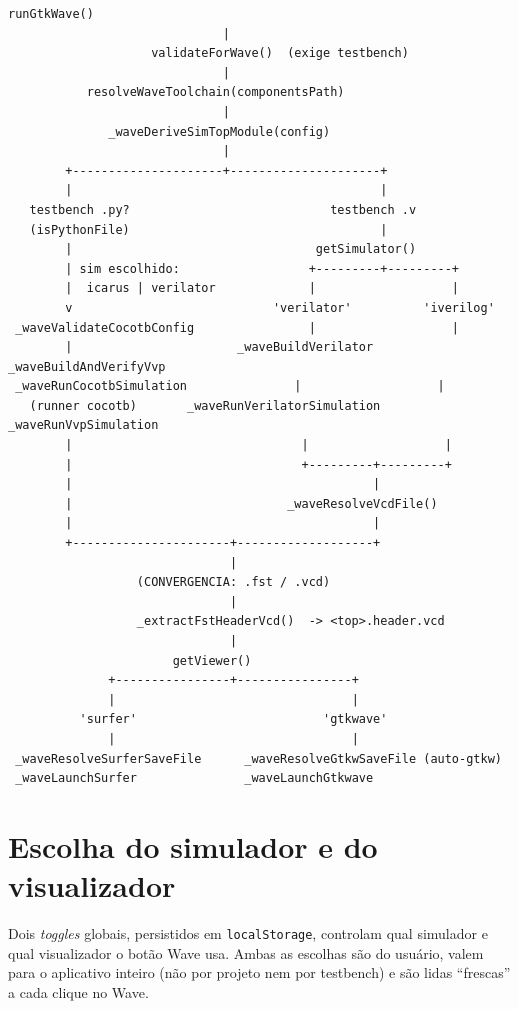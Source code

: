 \begin{lstlisting}[caption={Os quatro caminhos convergindo no arquivo de ondas e no visualizador.},captionpos=b]
                         runGtkWave()
                              |
                    validateForWave()  (exige testbench)
                              |
           resolveWaveToolchain(componentsPath)
                              |
              _waveDeriveSimTopModule(config)
                              |
        +---------------------+---------------------+
        |                                           |
   testbench .py?                            testbench .v
   (isPythonFile)                                   |
        |                                  getSimulator()
        | sim escolhido:                  +---------+---------+
        |  icarus | verilator             |                   |
        v                            'verilator'          'iverilog'
 _waveValidateCocotbConfig                |                   |
        |                       _waveBuildVerilator   _waveBuildAndVerifyVvp
 _waveRunCocotbSimulation               |                   |
   (runner cocotb)       _waveRunVerilatorSimulation   _waveRunVvpSimulation
        |                                |                   |
        |                                +---------+---------+
        |                                          |
        |                              _waveResolveVcdFile()
        |                                          |
        +----------------------+-------------------+
                               |
                  (CONVERGENCIA: .fst / .vcd)
                               |
                  _extractFstHeaderVcd()  -> <top>.header.vcd
                               |
                       getViewer()
              +----------------+----------------+
              |                                 |
          'surfer'                          'gtkwave'
              |                                 |
 _waveResolveSurferSaveFile      _waveResolveGtkwSaveFile (auto-gtkw)
 _waveLaunchSurfer               _waveLaunchGtkwave
\end{lstlisting}

\section{Escolha do simulador e do visualizador}

Dois \emph{toggles} globais, persistidos em \lstinline|localStorage|, controlam
qual simulador e qual visualizador o botão Wave usa. Ambas as escolhas são do
usuário, valem para o aplicativo inteiro (não por projeto nem por testbench) e
são lidas \enquote{frescas} a cada clique no Wave.

